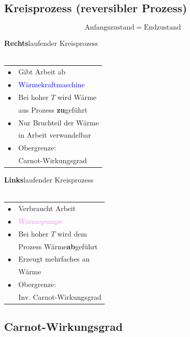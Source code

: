 \subsection{Kreisprozess (reversibler Prozess)}
$$ \text{Anfangszustand} \; = \; \text{Endzustand} $$ 


\begin{minipage}{0.48\linewidth}
\textbf{Rechts}laufender Kreisprozess \\
\\
\begin{tabular}{ll}
$\bullet$ & Gibt Arbeit ab\\
$\bullet$ & \textcolor{blue}{Wärmekraftmaschine} \\
$\bullet$ & Bei hoher $T$ wird Wärme  \\
		  & aus Prozess \textbf{zu}geführt\\
$\bullet$ & Nur Bruchteil der Wärme \\
		  & in Arbeit verwandelbar \\
$\bullet$ & Obergrenze: \\
		  & Carnot-Wirkungsgrad\\

\end{tabular}
\end{minipage}
\hfill
\begin{minipage}{0.48\linewidth}
\textbf{Links}laufender Kreisprozess \\
\\
\begin{tabular}{ll}
$\bullet$ & Verbraucht Arbeit \\
$\bullet$ & \textcolor{violet}{Wärmepumpe} \\
$\bullet$ & Bei hoher $T$ wird dem \\
		  & Prozess Wärme\textbf{ab}geführt\\
$\bullet$ & Erzeugt mehrfaches an \\
		  & Wärme \\
$\bullet$ & Obergrenze: \\
		  & Inv. Carnot-Wirkungsgrad \\
\end{tabular}
\end{minipage}








\subsection{Carnot-Wirkungsgrad}


